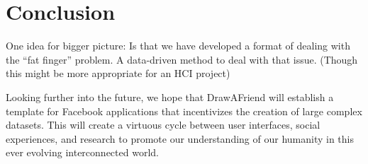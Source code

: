 \section{Conclusion}

One idea for bigger picture: Is that we have developed a format of dealing with the ``fat finger'' problem. A data-driven method to deal with that issue. (Though this might be more appropriate for an HCI project)

Looking further into the future, we hope that DrawAFriend will establish a template for Facebook applications that incentivizes the creation of large complex datasets. This will create a virtuous cycle between user interfaces, social experiences, and research to promote our understanding of our humanity in this ever evolving interconnected world.
